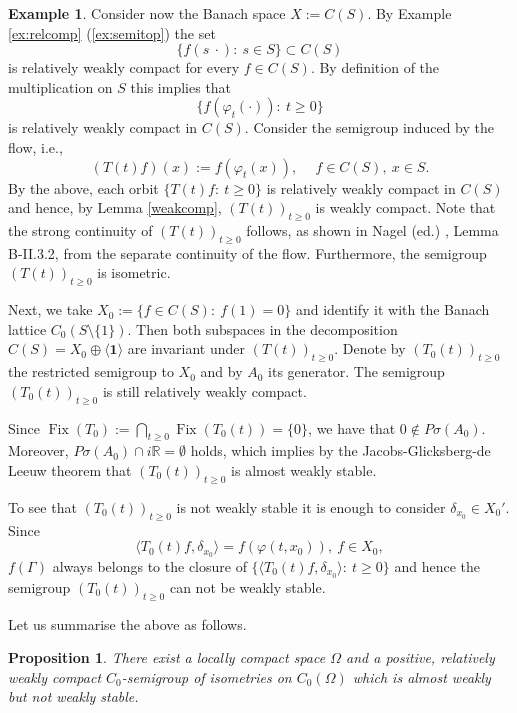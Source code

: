 \documentclass[11pt,intlimits, draft,oneside]{amsart}
\newtheorem{prop}[thm]{Proposition}
\theoremstyle{definition}
\newtheorem{example}[thm]{Example}
\newcommand\Eins{\mathbf{1}}
\def\Fix{\mathop{\mathrm{Fix}}}
\def\Psigma{P\sigma}
\def\RR{\mathbb{R}}
\begin{document}
\begin{example}
Consider now the Banach space $X:=C(S)$. By Example \ref{ex:relcomp}
(\ref{ex:semitop}) the set
%
\begin{equation*}
\{ f(s\:\cdot):\: s\in S \} \subset C(S)
\end{equation*}
is relatively weakly compact for every $f\in C(S)$. By definition of
the multiplication on $S$ this implies that
%
\begin{equation*}
\{ f(\varphi_t(\cdot)):\: t\geq 0 \}
\end{equation*}
is relatively weakly compact in $C(S)$. Consider the semigroup
induced by the flow, i.e.,
%
\begin{equation*}
(T(t)f)(x):=f(\varphi_t(x)),\quad\ f\in C(S),\: x\in S.
\end{equation*}
By the above, each orbit $\{T(t)f:\: t\geq 0 \}$ is relatively
weakly compact in $C(S)$ and hence, by Lemma \ref{weakcomp},
$(T(t))_{t\geq 0}$ is weakly compact. Note that the strong
continuity of $(T(t))_{t\geq 0}$ follows, as shown in Nagel (ed.)
\cite{nagel:1986}, Lemma B-II.3.2, from the separate continuity of
the flow. Furthermore, the semigroup $(T(t))_{t\geq 0}$ is
isometric.

Next, we take $X_0:=\{f\in C(S):\: f(1)=0\}$ and identify it with
the Banach lattice $C_0(S\setminus\{1\})$. Then both subspaces in
the decomposition $C(S)=X_0\oplus \langle \Eins  \rangle$ are
invariant under $(T(t))_{t\geq 0}$. Denote by $(T_0(t))_{t\geq 0}$
the restricted semigroup to $X_0$ and by $A_0$ its generator. The
semigroup $(T_0(t))_{t\geq 0}$ is still relatively weakly compact.

Since $\Fix(T_0):=\bigcap_{t\geq 0}\Fix(T_0(t))=\{0\}$, we have that
$0\notin \Psigma(A_0)$. Moreover, $\Psigma (A_0) \cap i\RR =
\emptyset$ holds, which implies by the Jacobs-Glicksberg-de Leeuw
theorem that $(T_0(t))_{t\geq 0}$ is almost weakly stable.

To see that $(T_0(t))_{t\geq 0}$ is not weakly stable it is enough
to consider $\delta_{x_0}\in X_0'$. Since
%
\begin{equation*}
\langle T_0(t)f, \delta_{x_0} \rangle = f(\varphi(t,x_0)), \ f\in
X_0,
\end{equation*}
$f(\Gamma)$ always belongs to the closure of $\{\langle T_0(t)f,
\delta_{x_0} \rangle:\: t\geq 0\}$ and hence the semigroup
$(T_0(t))_{t\geq 0}$ can not be weakly stable.
\end{example}


\noindent Let us summarise the above as follows.
\begin{prop}\label{prop:cexa1}There exist a locally compact space $\Omega$ and a positive, relatively weakly compact $C_0$-semigroup
of isometries on $C_0(\Omega)$ which is almost weakly but not weakly
stable.
\end{prop}
\end{document}
